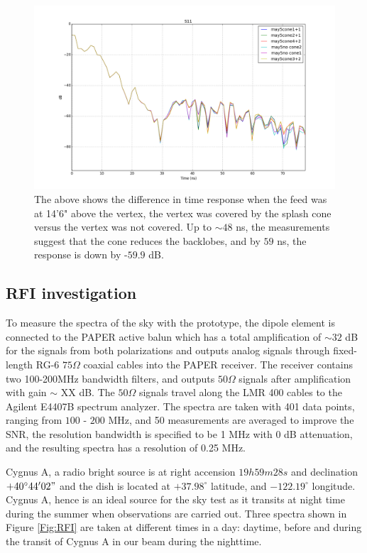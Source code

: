 \documentclass[preprint]{aastex}  %
\begin{document}
\begin{figure}[H]
	\begin{center}
	\includegraphics[width =.7\textwidth]{reflectometry_plots/May5/S11_cone_effect}
	\caption{The above shows the difference in time response when the feed was at 14'6" 
above the vertex, the vertex was covered by the splash cone versus the vertex was not covered.  
Up to $\sim 48$ ns, the measurements suggest that the cone reduces the backlobes, and by 
$59$ ns, the response is down by -$59.9$ dB.  
\label{Fig:conetest} }
	\end{center}
\end{figure}
\clearpage
\subsection{RFI investigation}
To measure the spectra of the sky with the prototype, the dipole element is connected to the PAPER active balun which has a total amplification of $\sim 32$ dB for the signals from both polarizations and outputs analog signals through fixed-length RG-6 $75\Omega$ coaxial cables into the PAPER receiver. The receiver contains two 100-200MHz bandwidth filters, and outputs $50\Omega$ signals after amplification with gain $\sim$ XX dB. The $50\Omega$ signals travel along the LMR 400 cables to the Agilent E4407B spectrum analyzer. The spectra are taken with 401 data points, ranging from $100$ - $200$ MHz, and 50 measurements are averaged to improve the SNR, the resolution bandwidth is specified to be 1 MHz with 0 dB attenuation, and the resulting spectra has a resolution of 0.25 MHz.

Cygnus A, a radio bright source is at right accension $19h59m28s$ and declination $+40^\circ44'02"$ and the dish is located at $+37.98^\circ$ latitude, and $-122.19^\circ$ longitude. Cygnus A, hence is an ideal source for the sky test as it transits at night time during the summer when observations are carried out. Three spectra shown in Figure \ref{Fig:RFI} are taken at different times in a day: daytime, before and during the transit of Cygnus A in our beam during the nighttime.
\end{document}

